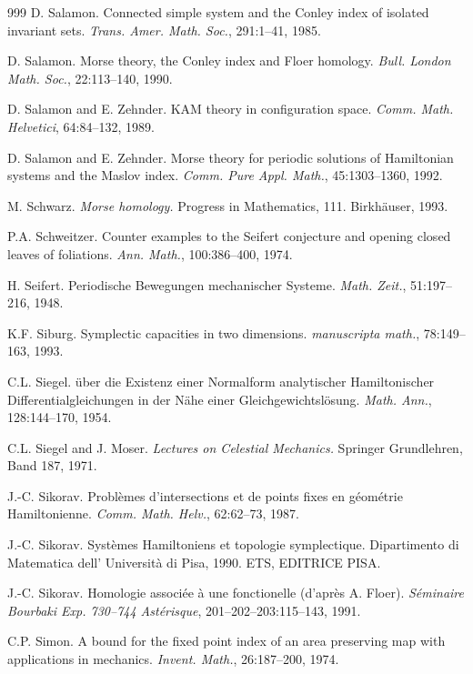 \begin{thebibliography}{999}
 D. Salamon. Connected simple system and the Conley
index of isolated invariant sets. \emph{Trans. Amer. Math. Soc.},
291:1--41, 1985.

 D. Salamon. Morse theory, the Conley index and Floer
homology. \emph{Bull. London Math. Soc.}, 22:113--140, 1990.

 D. Salamon and E. Zehnder. KAM theory in configuration
space. \emph{Comm. Math. Helvetici}, 64:84--132, 1989.

 D. Salamon and E. Zehnder. Morse theory for periodic
solutions of Hamiltonian systems and the Maslov index.
\emph{Comm. Pure Appl. Math.}, 45:1303--1360, 1992.

 M. Schwarz. \emph{Morse homology.} Progress in
Mathematics, 111. Birkhäuser, 1993.

 P.A. Schweitzer. Counter examples to the Seifert
conjecture and opening closed leaves of foliations. \emph{Ann. Math.},
100:386--400, 1974.

 H. Seifert. Periodische Bewegungen mechanischer Systeme.
\emph{Math. Zeit.}, 51:197--216, 1948.

 K.F. Siburg. Symplectic capacities in two dimensions.
\emph{manuscripta math.}, 78:149--163, 1993.

 C.L. Siegel. über die Existenz einer Normalform
analytischer Hamiltonischer Differentialgleichungen in der Nähe einer
Gleichgewichtslösung. \emph{Math. Ann.}, 128:144--170, 1954.

 C.L. Siegel and J. Moser. \emph{Lectures on Celestial
Mechanics.} Springer Grundlehren, Band 187, 1971.

 J.-C. Sikorav. Problèmes d'intersections et de points
fixes en géométrie Hamiltonienne. \emph{Comm. Math. Helv.}, 62:62--73,
1987.

 J.-C. Sikorav. Systèmes Hamiltoniens et topologie
symplectique. Dipartimento di Matematica dell' Università di Pisa, 1990.
ETS, EDITRICE PISA.

 J.-C. Sikorav. Homologie associée à une fonctionelle
(d'après A. Floer). \emph{Séminaire Bourbaki Exp. 730--744 Astérisque},
201--202--203:115--143, 1991.

 C.P. Simon. A bound for the fixed point index
of an area preserving map with applications in mechanics.
\emph{Invent. Math.}, 26:187--200, 1974.


\end{thebibliography}
